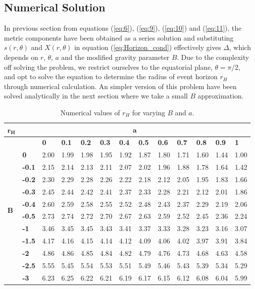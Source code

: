\documentclass[12pt,a4paper,oneside]{book}
\newcommand{\Eref}[1]{(\ref{eq:#1})}
\begin{document}
\subsection{Numerical Solution}
In previous section from equations \Eref{6}, \Eref{9}, \Eref{10} and \Eref{11}, the metric components have been obtained as a series solution and substituting $s(r,\theta)$ and $X(r,\theta)$ in equation \Eref{Horizon_cond} effectively gives $\Delta$, which depends on $r$, $\theta$, $a$ and the modified gravity parameter $B$. Due to the complexity off solving the problem, we restrict ourselves to the equatorial plane, $\theta = \pi/2$, and  opt to solve the equation to determine the radius of event horizon $r_H$ through numerical calculation. An simpler version of this problem have been solved analytically in the next section where we take a small $B$ approximation.
\begin{table}[t]
    \centering
\begin{tabular}{|p{0.15in}|p{0.3in}|p{0.3in}|p{0.3in}|p{0.3in}|p{0.3in}|p{0.3in}|p{0.3in}|p{0.3in}|p{0.3in}|p{0.3in}|p{0.3in}|p{0.3in}|} \hline
${\boldsymbol{r}}_{\boldsymbol{H}}$& \multicolumn{12}{|c|}{$\boldsymbol{a}$\textbf{}} \\ \hline
\multirow{12}{4em}{$\boldsymbol{B}$}&  & \textbf{0} & \textbf{0.1} & \textbf{0.2} & \textbf{0.3} & \textbf{0.4} & \textbf{0.5} & \textbf{0.6} & \textbf{0.7} & \textbf{0.8} & \textbf{0.9} & \textbf{1} \\ \cline{2-13}
 & \textbf{0} & 2.00 & 1.99 & 1.98 & 1.95 & 1.92 & 1.87 & 1.80 & 1.71 & 1.60 & 1.44 & 1.00 \\  \cline{2-13}
 & \textbf{-0.1} & 2.15 & 2.14 & 2.13 & 2.11 & 2.07 & 2.02 & 1.96 & 1.88 & 1.78 & 1.64 & 1.42 \\  \cline{2-13}
 & \textbf{-0.2} & 2.30 & 2.29 & 2.28 & 2.26 & 2.22 & 2.18 & 2.12 & 2.05 & 1.95 & 1.83 & 1.66 \\  \cline{2-13}
 & \textbf{-0.3} & 2.45 & 2.44 & 2.42 & 2.41 & 2.37 & 2.33 & 2.28 & 2.21 & 2.12 & 2.01 & 1.86 \\  \cline{2-13}
 & \textbf{-0.4} & 2.60 & 2.59 & 2.58 & 2.55 & 2.52 & 2.48 & 2.43 & 2.37 & 2.29 & 2.19 & 2.06 \\  \cline{2-13}
 & \textbf{-0.5} & 2.73 & 2.74 & 2.72 & 2.70 & 2.67 & 2.63 & 2.59 & 2.52 & 2.45 & 2.36 & 2.24 \\  \cline{2-13}
 & \textbf{-1} & 3.46 & 3.45 & 3.45 & 3.43 & 3.41 & 3.37 & 3.33 & 3.28 & 3.23 & 3.16 & 3.07 \\  \cline{2-13}
 & \textbf{-1.5} & 4.17 & 4.16 & 4.15 & 4.14 & 4.12 & 4.09 & 4.06 & 4.02 & 3.97 & 3.91 & 3.84 \\  \cline{2-13}
 & \textbf{-2} & 4.86 & 4.86 & 4.85 & 4.84 & 4.82 & 4.79 & 4.76 & 4.73 & 4.68 & 4.63 & 4.58 \\  \cline{2-13}
 & \textbf{-2.5} & 5.55 & 5.45 & 5.54 & 5.53 & 5.51 & 5.49 & 5.46 & 5.43 & 5.39 & 5.34 & 5.29 \\  \cline{2-13}
 & \textbf{-3} & 6.23 & 6.25 & 6.22 & 6.21 & 6.19 & 6.17 & 6.15 & 6.12 & 6.08 & 6.04 & 5.99 \\ \hline
 \end{tabular}
    \caption{Numerical values of $r_H$ for varying $B$ and $a$.}
    \label{Table1}
\end{table}
\end{document}
